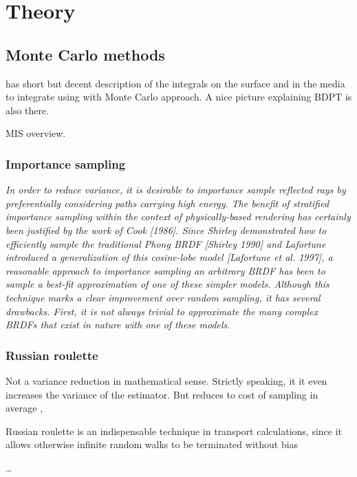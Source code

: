 \chapter{Theory}
\label{chapter:theory}

\section{Monte Carlo methods}
\label{Monte-Carlo}
\cite{Lafortune:1996:RPM:275458.275468} has short but decent description of the integrals on the
surface and in the media to integrate using with Monte Carlo approach.
A nice picture explaining BDPT is also there.

\gls{MIS} overview.
\subsection{Importance sampling}
\label{ImportanceSampling}
\emph{In order to reduce variance,  it is desirable to importance sample reflected rays by
preferentially considering paths carrying high energy.} \emph{The benefit of stratified importance
sampling  within  the  context  of  physically-based rendering  has  certainly  been  justified by 
the  work  of Cook  [1986].   Since  Shirley demonstrated  how  to  efficiently  sample  the 
traditional  Phong BRDF  [Shirley  1990]  and Lafortune  introduced  a  generalization of  this 
cosine-lobe  model  [Lafortune  et  al.  1997], a  reasonable approach to importance sampling an
arbitrary BRDF has been to sample  a  best-fit approximation  of  one  of  these  simpler  models.
Although this technique marks a clear improvement over random sampling,  it has several drawbacks.
First, it is not always trivial to approximate the many complex BRDFs that exist in nature with one
of these models.}

\subsection{Russian roulette}
\label{subsection:rr}
Not a variance reduction in mathematical sense. Strictly speaking, it it even
increases the variance of the estimator. But reduces to cost of sampling in
average \cite{Veach:1998:RMC:927297}, \cite{Csi03variancereduction}

Russian roulette is an indispensable technique in transport calculations, since it allows otherwise
infinite random walks to be terminated without bias \cite{Veach:1998:RMC:927297}

\ldots

